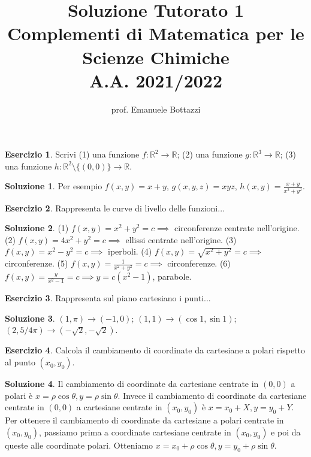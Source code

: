 \documentclass[12pt,a4paper]{article}
\title{Soluzione Tutorato 1\\Complementi di Matematica per le Scienze Chimiche\\ A.A. 2021/2022}
\author{prof. Emanuele Bottazzi}
\date{}
\theoremstyle{definition}
\newtheorem{exe}{Esercizio}
\newtheorem*{sol}{Soluzione}
\begin{document}
\maketitle

\begin{exe}
    Scrivi (1) una funzione $f: \mathbb{R}^2 \to \mathbb{R}$; (2) una funzione $g: \mathbb{R}^3 \to \mathbb{R}$; (3) una funzione $h: \mathbb{R}^2 \setminus \{(0,0)\} \to \mathbb{R}$.
\end{exe}
\begin{sol}
    Per esempio $f(x,y) = x+y$, $g(x,y,z) = xyz$, $h(x,y) = \frac{x+y}{x^2+y^2}$.
\end{sol}

\begin{exe}
    Rappresenta le curve di livello delle funzioni...
\end{exe}
\begin{sol}
    (1) $f(x,y) = x^2+y^2=c \implies$ circonferenze centrate nell'origine.
    (2) $f(x,y) = 4x^2+y^2=c \implies$ ellissi centrate nell'origine.
    (3) $f(x,y) = x^2-y^2=c \implies$ iperboli.
    (4) $f(x,y) = \sqrt{x^2+y^2}=c \implies$ circonferenze.
    (5) $f(x,y) = \frac{1}{x^2+y^2}=c \implies$ circonferenze.
    (6) $f(x,y) = \frac{y}{x^2-1}=c \implies y = c(x^2-1)$, parabole.
\end{sol}

\begin{exe}
    Rappresenta sul piano cartesiano i punti...
\end{exe}
\begin{sol}
    $(1, \pi) \to (-1, 0)$; $(1,1) \to (\cos 1, \sin 1)$; $(2, 5/4 \pi) \to (-\sqrt{2}, -\sqrt{2})$.
\end{sol}

\begin{exe}
    Calcola il cambiamento di coordinate da cartesiane a polari rispetto al punto $(x_0, y_0)$.
\end{exe}
\begin{sol}
    Il cambiamento di coordinate da cartesiane centrate in $(0,0)$ a polari è $x = \rho \cos \theta, y = \rho \sin \theta$. Invece il cambiamento di coordinate da cartesiane centrate in $(0,0)$ a cartesiane centrate in $(x_0, y_0)$ è $x = x_0 + X, y = y_0 + Y$. Per ottenere il cambiamento di coordinate da cartesiane a polari centrate in $(x_0, y_0)$, passiamo prima a coordinate cartesiane centrate in $(x_0, y_0)$ e poi da queste alle coordinate polari. Otteniamo $x = x_0 + \rho \cos \theta, y = y_0 + \rho \sin \theta$.
\end{sol}
\end{document}
